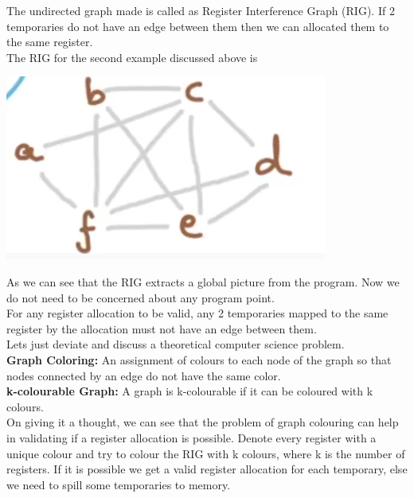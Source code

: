 The undirected graph made is called as Register Interference Graph (RIG). If 2 temporaries do not have an edge between them then we can allocated them to the same register.\\
The RIG for the second example discussed above is\\
\begin{center}
    \includegraphics[scale=0.2]{images/85_RIGeg2.png}\\
\end{center}
As we can see that the RIG extracts a global picture from the program. Now we do not need to be concerned about any program point.\\
For any register allocation to be valid, any 2 temporaries mapped to the same register by the allocation must not have an edge between them.\\
Lets just deviate and discuss a theoretical computer science problem.\\
\textbf{Graph Coloring:} An assignment of colours to each node of the graph so that nodes connected by an edge do not have the same color.\\
\textbf{k-colourable Graph:} A graph is k-colourable if it can be coloured with k colours.\\
On giving it a thought, we can see that the problem of graph colouring can help in validating if a register allocation is possible. Denote every register with a unique colour and try to colour the RIG with k colours, where k is the number of registers. If it is possible we get a valid register allocation for each temporary, else we need to spill some temporaries to memory.\\
